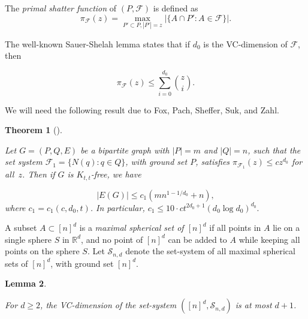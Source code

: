 \documentclass[11pt]{article}
\theoremstyle{plain}
\newtheorem{theorem}{Theorem}[section]
\newtheorem{lemma}[theorem]{Lemma}
\theoremstyle{definition}
\theoremstyle{remark}
\begin{document}
The \emph{primal shatter function} of $(P,\mathcal{F})$ is defined as
\[ \pi_{\mathcal{F}}(z) = \max_{P'\subset P, |P'| = z} | \{ A \cap P' \colon A \in \mathcal{F} \}|. \]

\noindent The well-known Sauer-Shelah lemma \cite{sauer,shelah} states that if $d_0$ is the VC-dimension of $\mathcal{F}$, then 

\begin{equation}\label{sauer} \pi_{\mathcal{F}}(z)  \leq \sum_{i=0}^{d_0} \binom{z}{i}. \end{equation}


\noindent We will need the following result due to Fox, Pach, Sheffer, Suk, and Zahl.


\begin{theorem}[\cite{fox}]\label{bipVC}

Let $G = (P, Q, E)$ be a bipartite graph with $|P| = m$ and $|Q| = n$, such that the set
system $\mathcal{F}_1 = \{N(q) \colon q \in Q\}$, with ground set $P$, satisfies $\pi_{\mathcal{F}_1}(z) \leq cz^{d_0}$ for all~$z$. Then if $G$ is $K_{t,t}$-free, we have 

\[ |E(G)| \leq c_1(mn^{1-1/d_0} + n), \]
where $c_1 = c_1(c, d_0, t)$.  In particular, $c_1 \leq 10\cdot ct^{2d_0 + 1}(d_0\log d_0)^{d_0}.$

\end{theorem}




A subset $A \subset [n]^d$ is a \emph{maximal spherical set of $[n]^d$} if all points in $A$ lie on a single sphere $S$ in $\mathbb{R}^d$, and no point of $[n]^d$ can be added to $A$ while keeping all points on the sphere $S$. Let $\mathcal{S}_{n,d}$ denote the set-system of all maximal spherical sets of $[n]^d$, with ground set $[n]^d$.  


\begin{lemma}\label{sphereVC}

For $d\geq 2$, the VC-dimension of the set-system $([n]^d,\mathcal{S}_{n,d})$ is at most $d+1$. 

\end{lemma}
\end{document}
